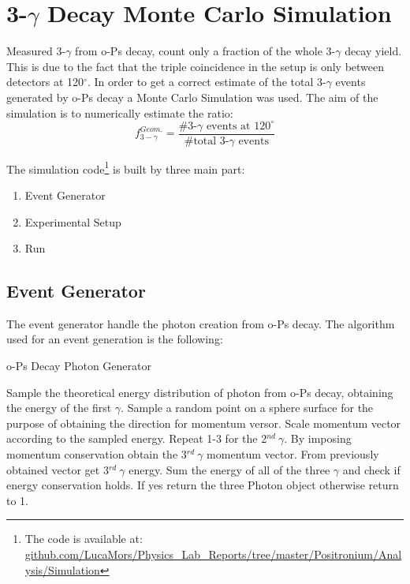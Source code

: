 \section*{3-$\gamma$ Decay Monte Carlo Simulation}

Measured 3-$\gamma$ from o-Ps decay, count only a fraction of the whole 3-$\gamma$ decay yield. This is due to the fact that the triple coincidence in the setup is only between detectors at 120$^\circ$. In order to get a correct estimate of the total 3-$\gamma$ events generated by o-Ps decay a Monte Carlo Simulation was used. The aim of the simulation is to numerically estimate the ratio:
\begin{equation*}
 f_{3-\gamma}^{Geom.} = \dfrac{\#\text{3-}\gamma\text{ events at 120}^\circ}{\#\text{total 3-}\gamma \text{ events}}
\end{equation*}

The simulation code\footnote{\noindent The code is available at:\\ \href{https://github.com/LucaMors/Physics_Lab_Reports/tree/master/Positronium/Analysis/Simulation}{github.com/LucaMors/Physics\_Lab\_Reports/tree/master/Positronium/Analysis/Simulation}} is built by three main part:
\begin{enumerate}
\item Event Generator
\item Experimental Setup
\item Run
\end{enumerate}

\subsection*{Event Generator}

The event generator handle the photon creation from o-Ps decay. The algorithm used for an event generation is the following:
\begin{algorithm}
\caption{o-Ps Decay Photon Generator}\label{euclid}
\begin{algorithmic}[1]
\State Sample the theoretical energy distribution of photon from o-Ps decay, obtaining the energy of the first $\gamma$.
\State Sample a random point on a sphere surface for the purpose of obtaining the direction for momentum versor.
\State Scale momentum vector according to the sampled energy.
\State Repeat 1-3 for the 2$^{nd}\ \gamma$.
\State By imposing momentum conservation obtain the 3$^{rd}\ \gamma$ momentum vector.
\State From previously obtained vector get 3$^{rd}\ \gamma$ energy.
\State Sum the energy of all of the three $\gamma$ and check if energy conservation holds. If yes return the three Photon object otherwise return to 1.
\end{algorithmic}
\end{algorithm}

